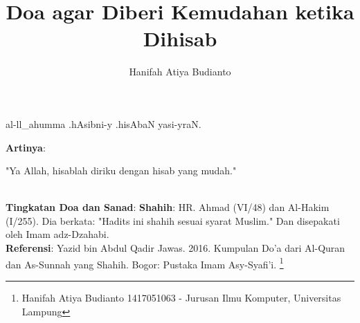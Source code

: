 \documentclass[a4paper,12pt]{article}
\title{\Large Doa agar Diberi Kemudahan ketika Dihisab}
\author{\calligra Hanifah Atiya Budianto}
\begin{document}
\sffamily
\maketitle 
\fullvocalize
{}
\begin{arabtext}
\noindent
al-ll_ahumma .hAsibni-y .hisAbaN yasi-yraN.\\
\end{arabtext}
\noindent
\textbf{Artinya}:
\par
\indent
"Ya Allah, hisablah diriku dengan hisab yang mudah."\\\\
\par
\noindent
\textbf{Tingkatan Doa dan Sanad}: \textbf{Shahih}: HR. Ahmad (VI/48) dan 
Al-Hakim (I/255).  Dia berkata: "Hadits ini shahih sesuai syarat Muslim." 
Dan disepakati oleh Imam adz-Dzahabi.\\
\textbf{Referensi}: Yazid bin Abdul Qadir Jawas. 2016. Kumpulan Do'a dari
Al-Quran dan As-Sunnah yang Shahih. Bogor: Pustaka Imam Asy-Syafi'i.
\footnote{Hanifah Atiya Budianto 1417051063 - Jurusan Ilmu Komputer,
Universitas Lampung}
\end{document}
